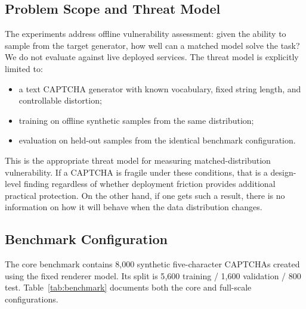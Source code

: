 \documentclass[pdflatex,sn-mathphys-num,iicol]{sn-jnl}
\begin{document}
\subsection{Problem Scope and Threat Model}

The experiments address offline vulnerability assessment: given the ability to sample from the target generator, how well can a matched model solve the task? We do not evaluate against live deployed services. The threat model is explicitly limited to:

\begin{itemize}
    \item a text CAPTCHA generator with known vocabulary, fixed string length, and controllable distortion;
    \item training on offline synthetic samples from the same distribution;
    \item evaluation on held-out samples from the identical benchmark configuration.
\end{itemize}

This is the appropriate threat model for measuring matched-distribution vulnerability. If a CAPTCHA is fragile under these conditions, that is a design-level finding regardless of whether deployment friction provides additional practical protection. On the other hand, if one gets such a result, there is no information on how it will behave when the data distribution changes.


\subsection{Benchmark Configuration}

The core benchmark contains 8{,}000 synthetic five-character CAPTCHAs created using the fixed renderer model. Its split is 5{,}600 training / 1{,}600 validation / 800 test. Table~\ref{tab:benchmark} documents both the core and full-scale configurations.
\end{document}
